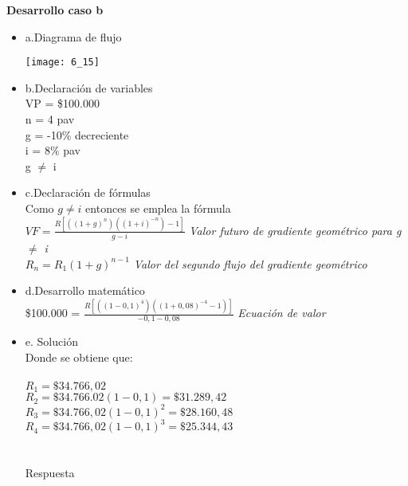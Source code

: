 	\textbf{Desarrollo caso b}\\
	\begin{itemize}
	    \item a.Diagrama de flujo\\
	    \begin{center}
			\texttt{[image: 6\_15]}
		\end{center}
		\item b.Declaración de variables\\
		VP = \$100.000\\
		n = 4 pav\\
		g = -10\% decreciente \\
		i = 8\% pav\\
		g $\not=$ i\\
		
		\item c.Declaración de fórmulas\\
		Como $g\not= i$ entonces se emplea la fórmula\\
		$VF = \frac{R[((1+g)^n)((1+i)^{-n})-1]}{g-i}$ \hspace{35 pt} \textit{Valor futuro de gradiente geométrico para g $\not=$ i}\\
		$R_{n} = R_{1}(1+g)^{n-1}$ \hspace{35 pt} \textit{Valor del segundo flujo del gradiente geométrico}\\
		\item d.Desarrollo matemático\\
		\$100.000 = $\frac{R[((1-0,1)^4)((1+0,08)^{-4}-1)]}{-0,1-0,08}$ \hspace{35 pt} \textit{Ecuación de valor}\\
		\item e. Solución\\
		Donde se obtiene que:\\\\
		$R_{1} = \$34.766,02$\\
		$R_{2} = \$34.766.02(1-0,1) = \$31.289,42$\\
		$R_{3} = \$34.766,02(1-0,1)^2 = \$28.160,48$\\
		$R_{4} = \$34.766,02(1-0,1)^3 = \$25.344,43$\\\\\\
		Respuesta\\
		

\end{itemize}
